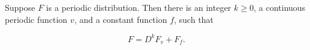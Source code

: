 Suppose $F$ is a periodic distribution. Then there is an integer $k \geq 0$, a continuous periodic function $v$, and a constant function $f$, such that

$$F = D^k F_v + F_f.$$
